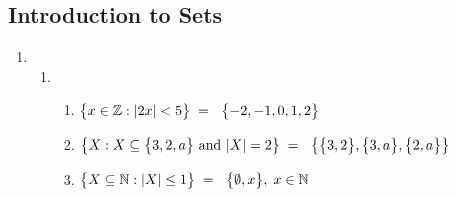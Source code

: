 \subsection*{Introduction to Sets}
\begin{enumerate}
      \item
            \begin{enumerate}[label=(\alph*), itemsep=16pt]
                  \item
                        \begin{enumerate}[label=(\roman*), itemsep=10pt]
                              \item $
                                          \bigl\{ { x \in \operatorname{\mathbb{Z}}: \lvert {2x} \rvert < 5 } \bigr\} \;=\; \
                                          \bigl\{ { -2, -1, 0, 1, 2 } \bigr\}
                                    $
                              \item $
                                          \bigl\{ { X : X \subseteq \bigl\{ {3,2,a} \bigr\} \text{ and } \lvert {X} \rvert = 2 } \bigr\} \;=\; \
                                          \bigl\{ { \bigl\{ { 3,2 } \bigr\}, \bigl\{ { 3,a } \bigr\}, \bigl\{ { 2,a } \bigr\} } \bigr\}
                                    $
                              \item $
                                          \bigl\{ { X \subseteq \operatorname{\mathbb{N}} : \lvert {X} \rvert \leq 1 } \bigr\} \;=\; \
                                          \bigl\{ { \emptyset, x } \bigr\},\; x \in \operatorname{\mathbb{N}}
                                    $
                        \end{enumerate}


\end{enumerate}
\end{enumerate}
